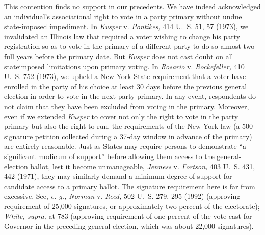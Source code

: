   This contention finds no support in our precedents. We have indeed acknowledged an individual's associational right to vote in a party primary without undue state-imposed impediment. In \emph{Kusper} v. \emph{Pontikes,} 414 U.~S. 51, 57 (1973), we invalidated an Illinois law that required a voter wishing to change his party registration so as to vote in the primary of a different party to do so almost two full years before the primary date. But \emph{Kusper} does not cast doubt on all stateimposed limitations upon primary voting. In \emph{Rosario} v. \emph{Rockefeller,} 410 U.~S. 752 (1973), we upheld a New York State requirement that a voter have enrolled in the party of his choice at least 30 days before the previous general election in order to vote in the next party primary. In any event, respondents do not claim that they have been excluded from voting in the primary. Moreover, even if we extended \emph{Kusper} to cover not only the right to vote in the party primary but also the right to run, the requirements of the New York law (a 500-signature petition collected during a 37-day window in advance of the primary) are entirely reasonable. Just as States may require persons to demonstrate ``a significant modicum of support'' before allowing them access to the general-election ballot, lest it become unmanageable, \emph{Jenness} v. \emph{Fortson,} 403 U.~S. 431, 442 (1971), they may similarly demand a minimum degree of support for candidate access to a primary ballot. The signature requirement here is far from excessive. See, \emph{e. g., Norman} v. \emph{Reed,} 502 U.~S. 279, 295 (1992) (approving requirement of 25,000 signatures, or approximately two percent of the electorate); \emph{White, supra,} at 783 (approving requirement of one percent of the vote cast for Governor in the preceding general election, which was about 22,000 signatures).

